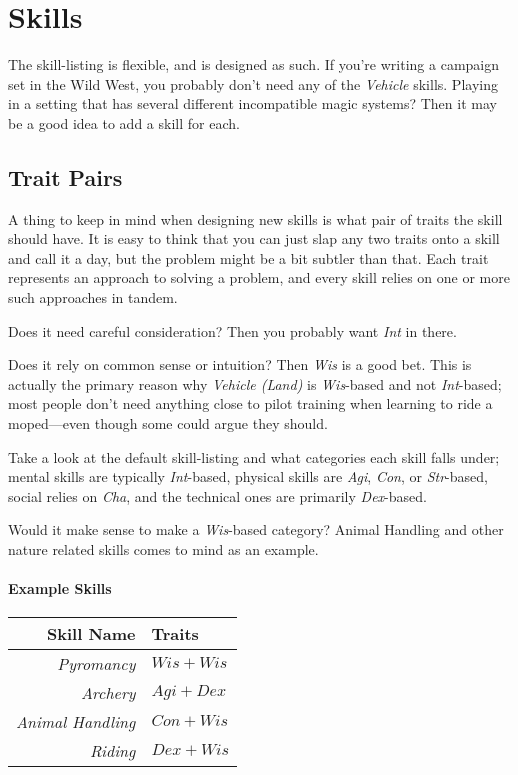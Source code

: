 \section{Skills}
The skill-listing is flexible, and is designed as such.
If you're writing a campaign set in the Wild West, you probably don't need any of the \textit{Vehicle} skills.
Playing in a setting that has several different incompatible magic systems? Then it may be a good idea to add a skill for each.

\subsection{Trait Pairs}
A thing to keep in mind when designing new skills is what pair of traits the skill should have.
It is easy to think that you can just slap any two traits onto a skill and call it a day, but the problem might be a bit subtler than that.
Each trait represents an approach to solving a problem, and every skill relies on one or more such approaches in tandem.

Does it need careful consideration? Then you probably want \textit{Int} in there.

Does it rely on common sense or intuition? Then \textit{Wis} is a good bet.
This is actually the primary reason why \textit{Vehicle (Land)} is \textit{Wis}-based and not \textit{Int}-based; most people don't need anything close to pilot training when learning to ride a moped---even though some could argue they should.

Take a look at the default skill-listing and what categories each skill falls under; mental skills are typically \textit{Int}-based, physical skills are \textit{Agi}, \textit{Con}, or \textit{Str}-based, social relies on \textit{Cha}, and the technical ones are primarily \textit{Dex}-based.

Would it make sense to make a \textit{Wis}-based category? Animal Handling and other nature related skills comes to mind as an example.

\paragraph{Example Skills}
\begin{center}
\begin{tabular}{r|l}
    \textbf{Skill Name}      & \textbf{Traits} \\\hline
    \textit{Pyromancy}       & $Wis + Wis$\\
    \textit{Archery}         & $Agi + Dex$\\
    \textit{Animal Handling} & $Con + Wis$\\
    \textit{Riding}          & $Dex + Wis$\\
\end{tabular}
\end{center}

